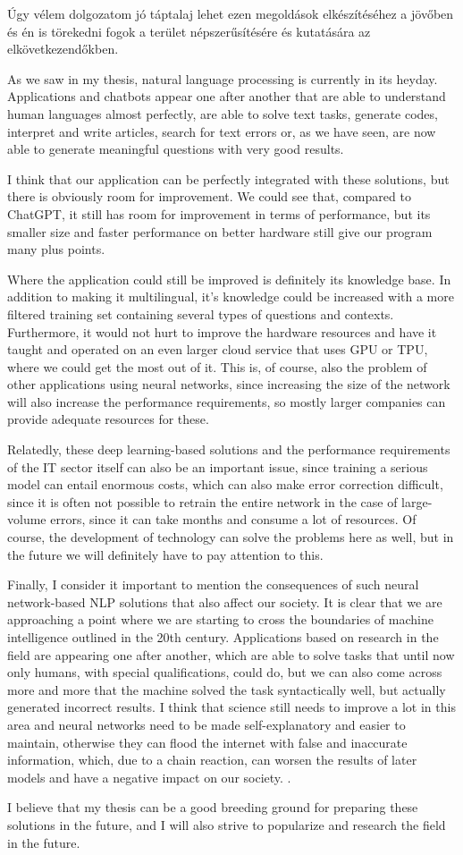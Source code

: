 Úgy vélem dolgozatom jó táptalaj lehet ezen megoldások elkészítéséhez a jövőben és én is törekedni fogok a terület népszerűsítésére és kutatására az elkövetkezendőkben.


As we saw in my thesis, natural language processing is currently in its heyday. Applications and chatbots appear one after another that are able to understand human languages almost perfectly, are able to solve text tasks, generate codes, interpret and write articles, search for text errors or, as we have seen, are now able to generate meaningful questions with very good results.

I think that our application can be perfectly integrated with these solutions, but there is obviously room for improvement. We could see that, compared to ChatGPT, it still has room for improvement in terms of performance, but its smaller size and faster performance on better hardware still give our program many plus points.

Where the application could still be improved is definitely its knowledge base. In addition to making it multilingual, it's knowledge could be increased with a more filtered training set containing several types of questions and contexts. Furthermore, it would not hurt to improve the hardware resources and have it taught and operated on an even larger cloud service that uses GPU or TPU, where we could get the most out of it. This is, of course, also the problem of other applications using neural networks, since increasing the size of the network will also increase the performance requirements, so mostly larger companies can provide adequate resources for these.

Relatedly, these deep learning-based solutions and the performance requirements of the IT sector itself can also be an important issue, since training a serious model can entail enormous costs, which can also make error correction difficult, since it is often not possible to retrain the entire network in the case of large-volume errors, since it can take months and consume a lot of resources. Of course, the development of technology can solve the problems here as well, but in the future we will definitely have to pay attention to this.

Finally, I consider it important to mention the consequences of such neural network-based NLP solutions that also affect our society. It is clear that we are approaching a point where we are starting to cross the boundaries of machine intelligence outlined in the 20th century. Applications based on research in the field are appearing one after another, which are able to solve tasks that until now only humans, with special qualifications, could do, but we can also come across more and more that the machine solved the task syntactically well, but actually generated incorrect results. I think that science still needs to improve a lot in this area and neural networks need to be made self-explanatory and easier to maintain, otherwise they can flood the internet with false and inaccurate information, which, due to a chain reaction, can worsen the results of later models and have a negative impact on our society. .

I believe that my thesis can be a good breeding ground for preparing these solutions in the future, and I will also strive to popularize and research the field in the future.